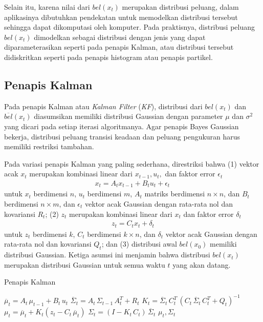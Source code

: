 Selain itu, karena nilai dari $bel(x_t)$ merupakan distribusi peluang, dalam aplikasinya dibutuhkan pendekatan untuk memodelkan distribusi tersebut sehingga dapat dikomputasi oleh komputer. Pada praktisnya, distribusi peluang $bel(x_t)$ dimodelkan sebagai distribusi dengan jenis yang dapat diparameterasikan seperti pada penapis Kalman, atau distribusi tersebut didiskritkan seperti pada penapis histogram atau penapis partikel.

\subsection{Penapis Kalman}

Pada penapis Kalman atau \textit{Kalman Filter} (\textit{KF}), distribusi dari $bel(x_t)$ dan $\overline{bel}(x_t)$ diasumsikan memiliki distribusi Gaussian dengan parameter $\mu$ dan $\sigma^2$ yang dicari pada setiap iterasi algoritmanya. Agar penapis Bayes Gaussian bekerja, distribusi peluang transisi keadaan dan peluang pengukuran harus memiliki restriksi tambahan.

Pada variasi penapis Kalman yang paling sederhana, direstriksi bahwa (1) vektor acak $x_t$ merupakan kombinasi linear dari $x_{t-1}, u_t,$ dan faktor error $\epsilon_t$
\begin{align}
    x_t = A_t x_{t-1} + B_t u_t + \epsilon_t \,
\end{align}
untuk $x_t$ berdimensi $n$, $u_t$ berdimensi $m$, $A_t$ matriks berdimensi $n \times n$, dan $B_t$ berdimensi $n \times m$, dan $\epsilon_t$ vektor acak Gaussian dengan rata-rata nol dan kovariansi $R_t$; (2) $z_t$ merupakan kombinasi linear dari $x_t$ dan faktor error $\delta_t$
\begin{align}
    z_t = C_t x_t + \delta_t
\end{align}
untuk $z_t$ berdimensi $k$, $C_t$ berdimensi $k \times n$, dan $\delta_t$ vektor acak Gaussian dengan rata-rata nol dan kovariansi $Q_t$; dan (3) distribusi awal $bel(x_0)$ memiliki distribusi Gaussian. Ketiga asumsi ini menjamin bahwa distribusi $bel(x_t)$ merupakan distribusi Gaussian untuk semua waktu $t$ yang akan datang.

\begin{algorithm}
    \caption{Penapis Kalman}
    \label{alg:kalman-filter}
    \begin{algorithmic}[1]
        \State $\overline{\mu}_t = A_t\, \mu_{t-1} + B_t\, u_t$
        \State $\overline{\Sigma}_t = A_t\, \Sigma_{t-1}\, A_t^T + R_t$
        \State $K_t = \overline{\Sigma}_t\, C_t^T\, (C_t\, \overline{\Sigma}_t\, C_t^T + Q_t)^{-1}$
        \State $\mu_t = \overline{\mu}_t + K_t(z_t - C_t\, \overline{\mu}_t)$
        \State $\Sigma_t = (I - K_t\, C_t)\, \overline{\Sigma}_t$
        \State \Return $\mu_t, \Sigma_t$
        \EndFunction
    \end{algorithmic}
\end{algorithm}

